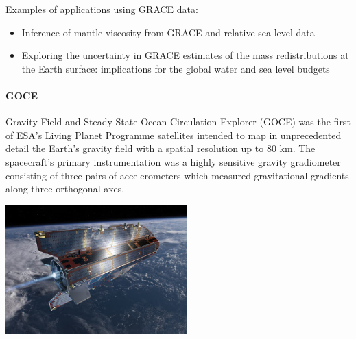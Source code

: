 Examples of applications using GRACE data:
\begin{itemize}
\item Inference of mantle viscosity from GRACE and relative sea level data \cite{pazw07}
\item Exploring the uncertainty in GRACE estimates of the mass
redistributions at the Earth surface: implications for the global water
and sea level budgets \cite{blml18}
\end{itemize}




\paragraph{GOCE}

Gravity Field and Steady-State Ocean Circulation Explorer (GOCE) was the first of ESA's 
Living Planet Programme satellites intended to map in unprecedented detail the Earth's gravity field
with a spatial resolution up to 80 km.
The spacecraft's primary instrumentation was a highly sensitive gravity gradiometer consisting of 
three pairs of accelerometers which measured gravitational gradients along three orthogonal axes.



\begin{center}
\includegraphics[width=7cm]{images/gravity/goce}
\end{center}

